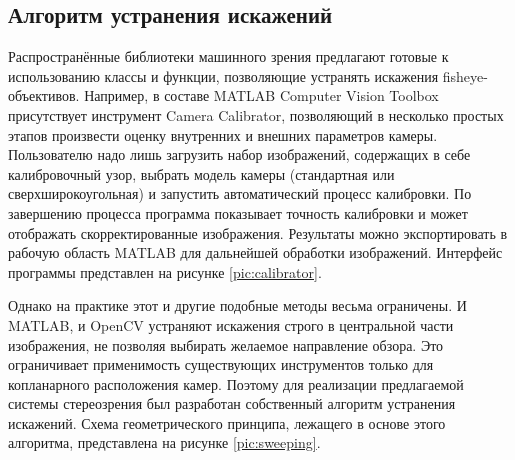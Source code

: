 \subsection{Алгоритм устранения искажений}
\label{dewarping}

Распространённые библиотеки машинного зрения предлагают готовые к использованию классы и функции, 
позволяющие устранять искажения fisheye-объективов. Например, в составе MATLAB Computer Vision Toolbox присутствует 
инструмент Camera Calibrator, позволяющий в несколько простых этапов  произвести оценку внутренних и внешних параметров
 камеры. Пользователю надо лишь  загрузить набор изображений, содержащих в себе калибровочный  узор, выбрать модель камеры 
(стандартная или сверхширокоугольная) и запустить автоматический процесс калибровки. По завершению процесса программа 
показывает точность калибровки и может отображать скорректированные изображения. Результаты можно экспортировать в рабочую 
область MATLAB для дальнейшей обработки изображений. Интерфейс программы представлен на рисунке \ref{pic:calibrator}. 


Однако на практике этот и другие подобные методы весьма ограничены. И MATLAB, и OpenCV устраняют искажения  строго 
в центральной части изображения, не позволяя выбирать  желаемое направление обзора.  Это ограничивает применимость 
существующих инструментов только для копланарного расположения  камер. Поэтому для реализации предлагаемой системы 
стереозрения  был разработан собственный алгоритм устранения искажений. Схема геометрического принципа, лежащего в
 основе этого алгоритма, представлена на рисунке \ref{pic:sweeping}.


